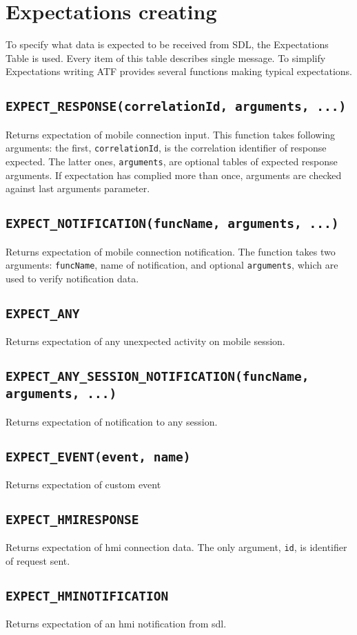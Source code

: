 \documentclass{article}
\begin{document}
\section{Expectations creating}
To specify what data is expected to be received from SDL, the Expectations
Table\label{expectations table} is used.
Every item of this table describes single message.
To simplify Expectations writing ATF provides several functions making typical
expectations.
\subsection{\tt EXPECT\_RESPONSE(correlationId, arguments, ...)}
Returns expectation of mobile connection input.
This function takes following arguments: the first, {\tt correlationId}, is the
correlation identifier of response expected.
The latter ones, {\tt arguments}, are optional tables of expected response
arguments.
If expectation has complied more than once, arguments are checked against last
arguments parameter.
\subsection{\tt EXPECT\_NOTIFICATION(funcName, arguments, ...)}
Returns expectation of mobile connection notification.
The function takes two arguments: {\tt funcName}, name of notification,
and optional {\tt arguments}, which are used to verify notification data.
\subsection{\tt EXPECT\_ANY}
Returns expectation of any unexpected activity on mobile session.
\subsection{\tt EXPECT\_ANY\_SESSION\_NOTIFICATION(funcName, arguments, ...)}
Returns expectation of notification to any session.
\subsection{\tt EXPECT\_EVENT(event, name)}
Returns expectation of custom event
\subsection{\tt EXPECT\_HMIRESPONSE}
Returns expectation of {\sc hmi} connection data.
The only argument, {\tt id}, is identifier of request sent.
\subsection{\tt EXPECT\_HMINOTIFICATION}
Returns expectation of an {\sc hmi} notification from {\sc sdl}.
\end{document}
